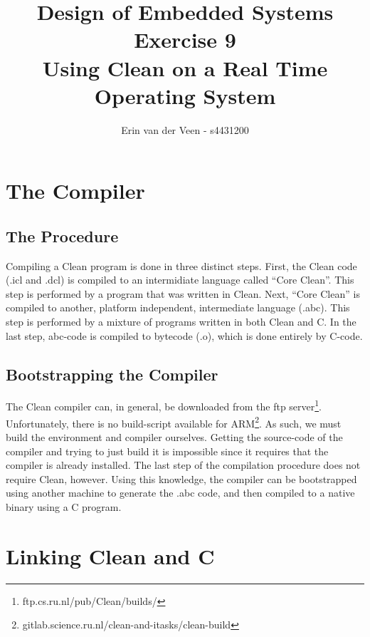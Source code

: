 \documentclass{scrartcl}
\title{Design of Embedded Systems\\Exercise 9\\Using Clean on a Real Time Operating System}
\author{Erin van der Veen - s4431200}
\begin{document}
\maketitle

\tableofcontents
\pagebreak

\section{The Compiler}
\subsection{The Procedure}
Compiling a Clean program is done in three distinct steps.
First, the Clean code (.icl and .dcl) is compiled to an intermidiate language called ``Core Clean''.
This step is performed by a program that was written in Clean.
Next, ``Core Clean'' is compiled to another, platform independent, intermediate language (.abc).
This step is performed by a mixture of programs written in both Clean and C.
In the last step, abc-code is compiled to bytecode (.o), which is done entirely by C-code.

\subsection{Bootstrapping the Compiler}
The Clean compiler can, in general, be downloaded from the ftp server\footnote{ftp.cs.ru.nl/pub/Clean/builds/}.
Unfortunately, there is no build-script available for ARM\footnote{gitlab.science.ru.nl/clean-and-itasks/clean-build}.
As such, we must build the environment and compiler ourselves.
Getting the source-code of the compiler and trying to just build it is impossible since it requires that the compiler is already installed.
The last step of the compilation procedure does not require Clean, however.
Using this knowledge, the compiler can be bootstrapped using another machine to generate the .abc code, and then compiled to a native binary using a C program.

\section{Linking Clean and C}
\end{document}
